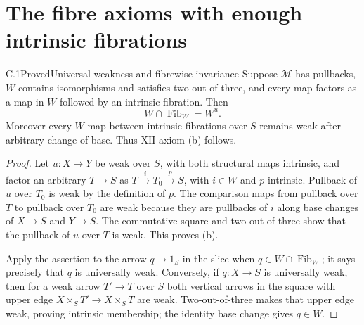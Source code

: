 \section{The fibre axioms with enough intrinsic fibrations}

\begin{claim}{C.1}{Proved}{Universal weakness and fibrewise invariance}
Suppose $\mathcal M$ has pullbacks, $W$ contains isomorphisms and
satisfies two-out-of-three, and every map factors as a map in $W$
followed by an intrinsic fibration. Then
\[
 W\cap\operatorname{Fib}_W=W^u.
\]
Moreover every $W$-map between intrinsic fibrations over $S$ remains
weak after arbitrary change of base. Thus XII axiom (b) follows.
\end{claim}
\begin{proof}
Let $u:X\to Y$ be weak over $S$, with both structural maps intrinsic,
and factor an arbitrary $T\to S$ as $T\xrightarrow i T_0
\xrightarrow p S$, with $i\in W$ and $p$ intrinsic. Pullback of $u$
over $T_0$ is weak by the definition of $p$. The comparison maps from
pullback over $T$ to pullback over $T_0$ are weak because they are
pullbacks of $i$ along base changes of $X\to S$ and $Y\to S$.
The commutative square and two-out-of-three show that the pullback of
$u$ over $T$ is weak. This proves (b).

Apply the assertion to the arrow $q\to1_S$ in the slice when
$q\in W\cap\operatorname{Fib}_W$; it says precisely that $q$ is
universally weak. Conversely, if $q:X\to S$ is universally weak,
then for a weak arrow $T'\to T$ over $S$ both vertical arrows in the
square with upper edge $X\times_ST'\to X\times_ST$ are weak.
Two-out-of-three makes that upper edge weak, proving intrinsic
membership; the identity base change gives $q\in W$.
\end{proof}

